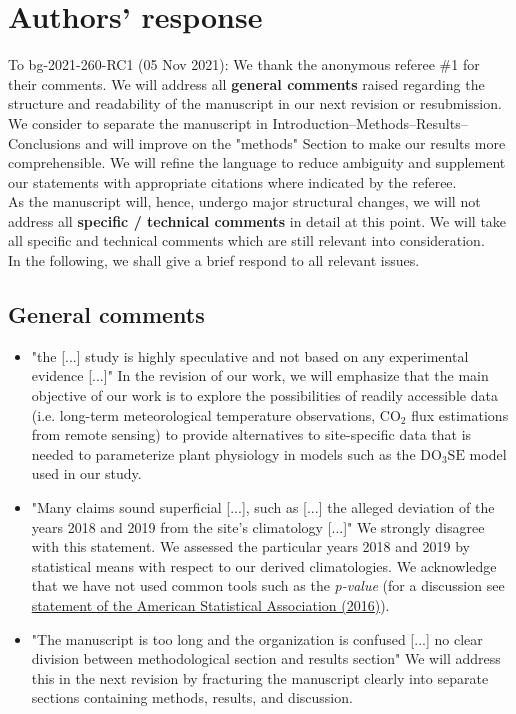\documentclass{scrartcl}
\begin{document}
\section*{Authors' response}
To bg-2021-260-RC1 (05 Nov 2021):
We thank the anonymous referee \#1 for their comments.
We will address all \textbf{general comments} raised regarding the structure and readability of the manuscript in our next revision or resubmission. We consider to separate the manuscript in Introduction--Methods--Results--Conclusions and will improve on the "methods" Section to make our results more comprehensible. We will refine the language to reduce ambiguity and supplement our statements with appropriate citations where indicated by the referee.\\
As the manuscript will, hence, undergo major structural changes, we will not address all \textbf{specific / technical comments} in detail at this point. We will take all specific and technical comments which are still relevant into consideration.\\
In the following, we shall give a brief respond to all relevant issues.

\subsection*{General comments} 
\begin{itemize}
    
    \item {\color{blue} "the [...] study is highly speculative and not based on any experimental evidence [...]"} In the revision of our work, we will emphasize that the main objective of our work is to explore the possibilities of readily accessible data (i.e. long-term meteorological temperature observations, $\mathrm{CO_2}$ flux estimations from remote sensing) to provide alternatives to site-specific data that is needed to parameterize plant physiology in models such as the $\mathrm{DO_3SE}$ model used in our study.
    \item {\color{blue} "Many claims sound superficial [...], such as [...] the alleged deviation of the years 2018 and 2019 from the site's climatology [...]"} We strongly disagree with this statement. We assessed the particular years 2018 and 2019 by statistical means with respect to our derived climatologies. We acknowledge that we have not used common tools such as the \emph{p-value} (for a discussion see \href{https://doi.org/10.1080/00031305.2016.1154108}{statement of the American Statistical Association (2016)}).
    \item {\color{blue} "The manuscript is too long and the organization is confused [...] no clear division between methodological section and results section"} We will address this in the next revision by fracturing the manuscript clearly into separate sections containing methods, results, and discussion.

\end{itemize}
\end{document}
